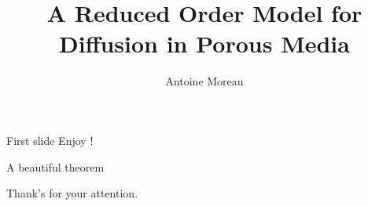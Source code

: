 \documentclass{beamer}
\title{A Reduced Order Model for Diffusion in Porous Media}
\author{Antoine Moreau}
\begin{document}

\maketitle

\begin{frame}{First slide}
Enjoy !
\end{frame}

\begin{frame}
\begin{theorem}
A beautiful theorem
\end{theorem}
\end{frame}

\begin{frame}%
\begin{center}
Thank's for your attention.
\end{center}
\end{frame}
\end{document}
